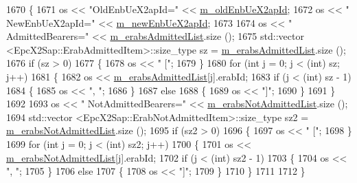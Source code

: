 \begin{DoxyCode}
1670 \{
1671   os << \textcolor{stringliteral}{"OldEnbUeX2apId="} << \hyperlink{classns3_1_1EpcX2HandoverRequestAckHeader_a5a92dccc1ba92cab6e24c3ee08c3f418}{m\_oldEnbUeX2apId};
1672   os << \textcolor{stringliteral}{" NewEnbUeX2apId="} << \hyperlink{classns3_1_1EpcX2HandoverRequestAckHeader_a6a743b8acf6351e7a8a63d361888793a}{m\_newEnbUeX2apId};
1673 
1674   os << \textcolor{stringliteral}{" AdmittedBearers="} << \hyperlink{classns3_1_1EpcX2HandoverRequestAckHeader_aae103cf49fa679625cf673810ecb29e6}{m\_erabsAdmittedList}.size ();
1675   std::vector <EpcX2Sap::ErabAdmittedItem>::size\_type sz = \hyperlink{classns3_1_1EpcX2HandoverRequestAckHeader_aae103cf49fa679625cf673810ecb29e6}{m\_erabsAdmittedList}.size ();
1676   \textcolor{keywordflow}{if} (sz > 0)
1677     \{
1678       os << \textcolor{stringliteral}{" ["};
1679     \}
1680   \textcolor{keywordflow}{for} (\textcolor{keywordtype}{int} j = 0; j < (int) sz; j++)
1681     \{
1682       os << \hyperlink{classns3_1_1EpcX2HandoverRequestAckHeader_aae103cf49fa679625cf673810ecb29e6}{m\_erabsAdmittedList}[j].erabId;
1683       \textcolor{keywordflow}{if} (j < (\textcolor{keywordtype}{int}) sz - 1)
1684         \{
1685           os << \textcolor{stringliteral}{", "};
1686         \}
1687       \textcolor{keywordflow}{else}
1688         \{
1689           os << \textcolor{stringliteral}{"]"};
1690         \}
1691     \}
1692   
1693   os << \textcolor{stringliteral}{" NotAdmittedBearers="} << \hyperlink{classns3_1_1EpcX2HandoverRequestAckHeader_abe32eccfe9ba3a6abde04f72bfb32b8b}{m\_erabsNotAdmittedList}.size ();
1694   std::vector <EpcX2Sap::ErabNotAdmittedItem>::size\_type sz2 = 
      \hyperlink{classns3_1_1EpcX2HandoverRequestAckHeader_abe32eccfe9ba3a6abde04f72bfb32b8b}{m\_erabsNotAdmittedList}.size ();
1695   \textcolor{keywordflow}{if} (sz2 > 0)
1696     \{
1697       os << \textcolor{stringliteral}{" ["};
1698     \}
1699   \textcolor{keywordflow}{for} (\textcolor{keywordtype}{int} j = 0; j < (int) sz2; j++)
1700     \{
1701       os << \hyperlink{classns3_1_1EpcX2HandoverRequestAckHeader_abe32eccfe9ba3a6abde04f72bfb32b8b}{m\_erabsNotAdmittedList}[j].erabId;
1702       \textcolor{keywordflow}{if} (j < (\textcolor{keywordtype}{int}) sz2 - 1)
1703         \{
1704           os << \textcolor{stringliteral}{", "};
1705         \}
1706       \textcolor{keywordflow}{else}
1707         \{
1708           os << \textcolor{stringliteral}{"]"};
1709         \}
1710     \}
1711 
1712 \}
\end{DoxyCode}
